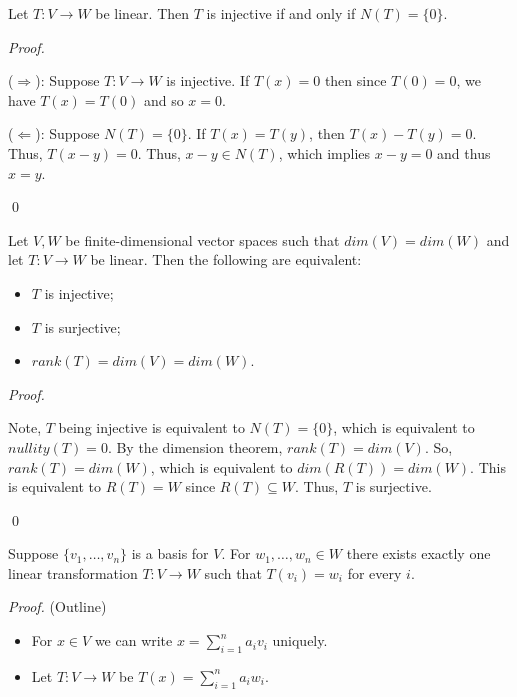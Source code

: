 \documentclass[12pt]{article}
\newenvironment{theorem}[2][Theorem]{\begin{trivlist}
\item[\hskip \labelsep {\bfseries #1}\hskip \labelsep {\bfseries #2.}]}{\end{trivlist}}
\newenvironment{sol}
    {\emph{Proof.}
    }
    {
    \qed
    }
\begin{document}
\begin{theorem}{2.4}
Let $T : V \to W$ be linear. Then $T$ is injective if and only if $N(T) = \{0\}$.
\end{theorem}

\begin{sol}

($\Longrightarrow$): Suppose $T : V \to W$ is injective. If $T(x) = 0$ then since $T(0) = 0$, we have $T(x) = T(0)$ and so $x = 0$.

($\Longleftarrow$): Suppose $N(T) = \{0\}$. If $T(x) = T(y)$, then $T(x) - T(y) = 0$. Thus, $T(x-y) = 0$. Thus, $x - y \in N(T)$, which implies $x - y = 0$ and thus $x = y$.
\end{sol}

\begin{theorem}{2.5}
Let $V,W$ be finite-dimensional vector spaces such that $dim(V) = dim(W)$ and let $T : V \to W$ be linear. Then the following are equivalent:

\begin{itemize}
    \item[(a)] $T$ is injective;
    \item[(b)] $T$ is surjective;
    \item[(c)] $rank(T) = dim(V) = dim(W)$.
\end{itemize}
\end{theorem}

\begin{sol}
Note, $T$ being injective is equivalent to $N(T) = \{0\}$, which is equivalent to $nullity(T) = 0$. By the dimension theorem, $rank(T) = dim(V)$. So, $rank(T) = dim(W)$, which is equivalent to $dim(R(T)) = dim(W)$. This is equivalent to $R(T) = W$ since $R(T) \subseteq W$. Thus, $T$ is surjective.
\end{sol}

\begin{theorem}{2.6}
Suppose $\{v_1, \dots, v_n\}$ is a basis for $V$. For $w_1, \dots, w_n \in W$ there exists exactly one linear transformation $T : V \to W$ such that $T(v_i) = w_i$ for every $i$.
\end{theorem}

\textit{Proof.} (Outline)
\begin{itemize}
    \item For $x \in V$ we can write $x = \sum_{i = 1}^n a_iv_i$ uniquely.
    \item Let $T : V \to W$ be $T(x) = \sum_{i = 1}^na_iw_i$.
\end{itemize}
\end{document}
